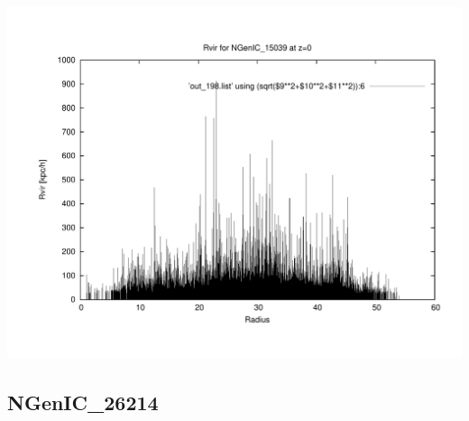 \includegraphics[scale=0.3]{NGenIC_15039/plot_rvir_z0.pdf}


% 
%
%
%
%
%
%
%


\newpage
\subsection{NGenIC\_26214}

